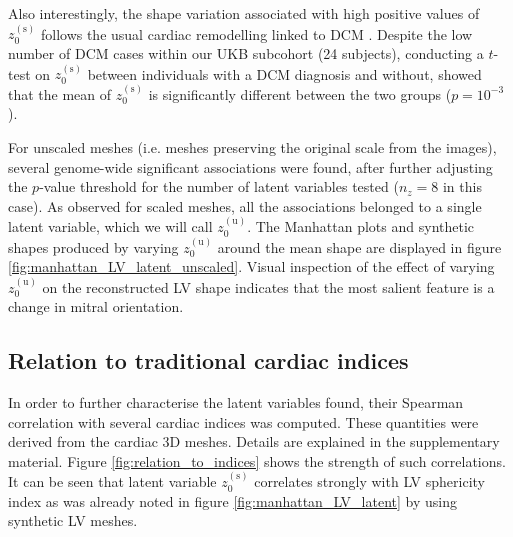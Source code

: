 Also interestingly, the shape variation associated with high positive values of $z_0^{(\text{s})}$ follows the usual cardiac remodelling linked to DCM \cite{ref_dcm}. Despite the low number of DCM cases within our UKB subcohort (24 subjects), conducting a $t$-test on $z_0^{(\text{s})}$ between individuals with a DCM diagnosis and without, showed that the mean of $z_0^{(\text{s})}$ is significantly different between the two groups ($p=10^{-3}$).


For unscaled meshes (i.e. meshes preserving the original scale from the images), several genome-wide significant associations were found, after further adjusting the $p$-value threshold for the number of latent variables tested ($n_z=8$ in this case). As observed for scaled meshes, all the associations belonged to a single latent variable, which we will call $z_0^{(\text{u})}$. The Manhattan plots and synthetic shapes produced by varying $z_0^{(\text{u})}$ around the mean shape are displayed in figure \ref{fig:manhattan_LV_latent_unscaled}. Visual inspection of the effect of varying $z_0^{(\text{u})}$ on the reconstructed LV shape indicates that the most salient feature is a change in mitral orientation.


\subsection*{Relation to traditional cardiac indices}
In order to further characterise the latent variables found, their Spearman correlation with several cardiac indices was computed. These quantities were derived from the cardiac 3D meshes. Details are explained in the supplementary material.
Figure \ref{fig:relation_to_indices} shows the strength of such correlations.
It can be seen that latent variable $z_0^{(\text{s})}$ correlates strongly with LV sphericity index as was already noted in figure \ref{fig:manhattan_LV_latent} by using synthetic LV meshes.

